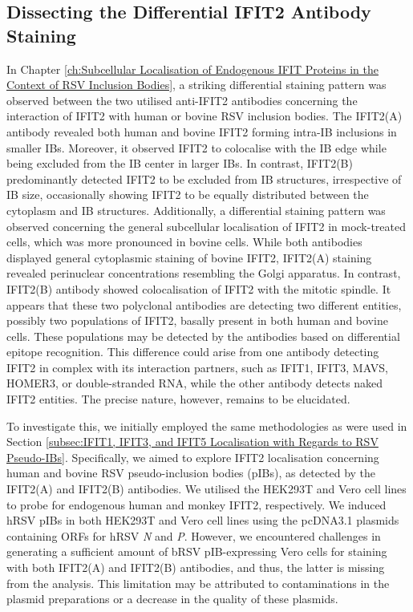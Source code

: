 \subsection{Dissecting the Differential IFIT2 Antibody Staining} \label{subsec:Dissecting the Differential IFIT2 Antibody Staining}
In Chapter \ref{ch:Subcellular Localisation of Endogenous IFIT Proteins in the Context of RSV Inclusion Bodies}, a striking differential staining pattern was observed between the two utilised anti-IFIT2 antibodies concerning the interaction of IFIT2 with human or bovine RSV inclusion bodies. The IFIT2(A) antibody revealed both human and bovine IFIT2 forming intra-IB inclusions in smaller IBs. Moreover, it observed IFIT2 to colocalise with the IB edge while being excluded from the IB center in larger IBs. In contrast, IFIT2(B) predominantly detected IFIT2 to be excluded from IB structures, irrespective of IB size, occasionally showing IFIT2 to be equally distributed between the cytoplasm and IB structures. Additionally, a differential staining pattern was observed concerning the general subcellular localisation of IFIT2 in mock-treated cells, which was more pronounced in bovine cells. While both antibodies displayed general cytoplasmic staining of bovine IFIT2, IFIT2(A) staining revealed perinuclear concentrations resembling the Golgi apparatus. In contrast, IFIT2(B) antibody showed colocalisation of IFIT2 with the mitotic spindle. It appears that these two polyclonal antibodies are detecting two different entities, possibly two populations of IFIT2, basally present in both human and bovine cells. These populations may be detected by the antibodies based on differential epitope recognition. This difference could arise from one antibody detecting IFIT2 in complex with its interaction partners, such as IFIT1, IFIT3, MAVS, HOMER3, or double-stranded RNA, while the other antibody detects naked IFIT2 entities. The precise nature, however, remains to be elucidated.

To investigate this, we initially employed the same methodologies as were used in Section \ref{subsec:IFIT1, IFIT3, and IFIT5 Localisation with Regards to RSV Pseudo-IBs}. Specifically, we aimed to explore IFIT2 localisation concerning human and bovine RSV pseudo-inclusion bodies (pIBs), as detected by the IFIT2(A) and IFIT2(B) antibodies. We utilised the HEK293T and Vero cell lines to probe for endogenous human and monkey IFIT2, respectively. We induced hRSV pIBs in both HEK293T and Vero cell lines using the pcDNA3.1 plasmids containing ORFs for hRSV \textit{N} and \textit{P}. However, we encountered challenges in generating a sufficient amount of bRSV pIB-expressing Vero cells for staining with both IFIT2(A) and IFIT2(B) antibodies, and thus, the latter is missing from the analysis. This limitation may be attributed to contaminations in the plasmid preparations or a decrease in the quality of these plasmids.

